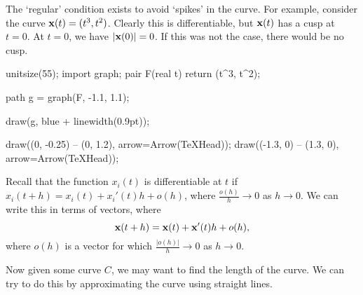 \documentclass[a4paper]{scrreprt}
\begin{document}
\begin{remark}
	The `regular' condition exists to avoid `spikes' in the curve. For example, consider the curve $\mathbf{x}(t) = (t^3, t^2)$. Clearly this is differentiable, but $\mathbf{x}(t)$ has a cusp at $t = 0$. At $t = 0$, we have $|\mathbf{x}(0)| = 0$. If this was not the case, there would be no cusp.
\begin{center}
	\begin{asy}
		unitsize(55);
		import graph;
		pair F(real t) {
			return (t^3, t^2);
		}

		path g = graph(F, -1.1, 1.1);

		draw(g, blue + linewidth(0.9pt));

		draw((0, -0.25) -- (0, 1.2), arrow=Arrow(TeXHead));
		draw((-1.3, 0) -- (1.3, 0), arrow=Arrow(TeXHead));
	\end{asy}
\end{center}

\end{remark}


Recall that the function $x_i(t)$ is differentiable at $t$ if $x_i(t + h) = x_i(t) + x_i'(t) h + o(h)$, where $\frac{o(h)}{h} \rightarrow 0$ as $h \rightarrow 0$. We can write this in terms of vectors, where
$$
\mathbf{x}(t + h) = \mathbf{x}(t) + \mathbf{x}'(t)h + o(h),
$$
where $o(h)$ is a vector for which $\frac{|o(h)|}{h} \rightarrow 0$ as $h \rightarrow 0$.
  
Now given some curve $C$, we may want to find the length of the curve. We can try to do this by approximating the curve using straight lines.
\end{document}
